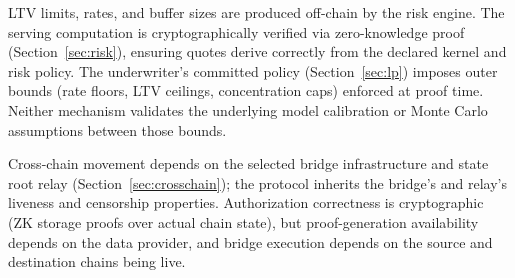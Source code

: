 LTV limits, rates, and buffer sizes are produced off-chain by the risk engine. The serving computation is cryptographically verified via zero-knowledge proof (Section~\ref{sec:risk}), ensuring quotes derive correctly from the declared kernel and risk policy. The underwriter's committed policy (Section~\ref{sec:lp}) imposes outer bounds (rate floors, LTV ceilings, concentration caps) enforced at proof time. Neither mechanism validates the underlying model calibration or Monte Carlo assumptions between those bounds.

Cross-chain movement depends on the selected bridge infrastructure and state root relay
(Section~\ref{sec:crosschain}); the protocol inherits the bridge's and relay's liveness
and censorship properties. Authorization correctness is cryptographic
(ZK storage proofs over actual chain state), but proof-generation availability
depends on the data provider, and bridge execution depends on the source
and destination chains being live.
